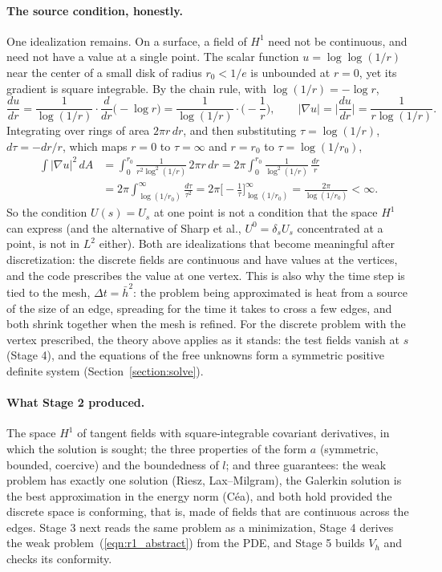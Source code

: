 \paragraph{The source condition, honestly.} One idealization remains. On a surface, a field of $H^1$ need not be continuous, and need not have a value at a single point. The scalar function $u = \log\log(1/r)$ near the center of a small disk of radius $r_0 < 1/e$ is unbounded at $r = 0$, yet its gradient is square integrable. By the chain rule, with $\log(1/r) = -\log r$,
\begin{equation*}
\frac{du}{dr} = \frac{1}{\log(1/r)}\cdot\frac{d}{dr}\big(-\log r\big) = \frac{1}{\log(1/r)}\cdot\Big(-\frac1r\Big), \qquad |\nabla u| = \Big|\frac{du}{dr}\Big| = \frac{1}{r\log(1/r)} .
\end{equation*}
Integrating over rings of area $2\pi r\, dr$, and then substituting $\tau = \log(1/r)$, $d\tau = -dr/r$, which maps $r = 0$ to $\tau = \infty$ and $r = r_0$ to $\tau = \log(1/r_0)$,
\begin{align*}
\int |\nabla u|^2\, dA &= \int_0^{r_0} \frac{1}{r^2 \log^2(1/r)}\, 2\pi r\, dr = 2\pi \int_0^{r_0} \frac{1}{\log^2(1/r)}\,\frac{dr}{r} \\
&= 2\pi \int_{\log(1/r_0)}^{\infty} \frac{d\tau}{\tau^2} = 2\pi \Big[ -\frac1\tau \Big]_{\log(1/r_0)}^{\infty} = \frac{2\pi}{\log(1/r_0)} < \infty .
\end{align*}
So the condition $U(s) = U_s$ at one point is not a condition that the space $H^1$ can express (and the alternative of Sharp et al., $U^0 = \delta_s U_s$ concentrated at a point, is not in $L^2$ either). Both are idealizations that become meaningful after discretization: the discrete fields are continuous and have values at the vertices, and the code prescribes the value at one vertex. This is also why the time step is tied to the mesh, $\Delta t = \bar h^2$: the problem being approximated is heat from a source of the size of an edge, spreading for the time it takes to cross a few edges, and both shrink together when the mesh is refined. For the discrete problem with the vertex prescribed, the theory above applies as it stands: the test fields vanish at $s$ (Stage 4), and the equations of the free unknowns form a symmetric positive definite system (Section~\ref{section:solve}).

\paragraph{What Stage 2 produced.} The space $H^1$ of tangent fields with square-integrable covariant derivatives, in which the solution is sought; the three properties of the form $a$ (symmetric, bounded, coercive) and the boundedness of $l$; and three guarantees: the weak problem has exactly one solution (Riesz, Lax--Milgram), the Galerkin solution is the best approximation in the energy norm (C\'ea), and both hold provided the discrete space is conforming, that is, made of fields that are continuous across the edges. Stage 3 next reads the same problem as a minimization, Stage 4 derives the weak problem~(\ref{eqn:r1_abstract}) from the PDE, and Stage 5 builds $V_h$ and checks its conformity.

